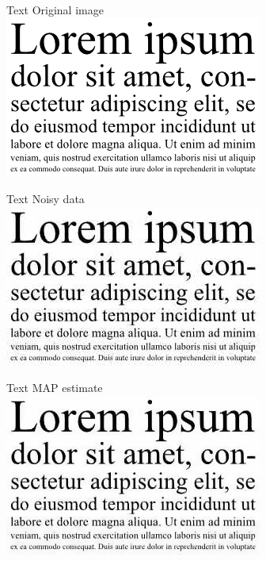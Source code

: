 \documentclass[10pt]{beamer}
\begin{document}
\begin{frame}{Text}
\centering
Original image
\\
\includegraphics[height=37ex]{results/lorem} 
\end{frame}
\begin{frame}{Text}
\centering
Noisy data
\\
\includegraphics[height=37ex]{results/lorem-tmp} 
\end{frame}
\begin{frame}{Text}
\centering
MAP estimate\vphantom{y}
\\
\includegraphics[height=37ex]{results/lorem-fixed}
\end{frame}
\end{document}

